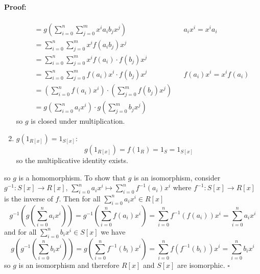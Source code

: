 \documentclass [12pt] {article}
\newenvironment{proof}{\paragraph{Proof:}}{\hfill$\square$}
\begin{document}
\begin{proof}
\begin{enumerate}
\begin{align*}
                &= 
                g \left(\sum^{n}_{i = 0} \sum^{m}_{j = 0} x^i a_i b_j x^j \right)
                && a_i x^i = x^i a_i \\
                &= \sum^{n}_{i = 0} \sum^{m}_{j = 0} x^i f(a_i b_j) x^j \\
                &= \sum^{n}_{i = 0} \sum^{m}_{j = 0} x^i f(a_i) \cdot f(b_j) x^j \\
                &= \sum^{n}_{i = 0} \sum^{m}_{j = 0} f(a_i) x^i \cdot f(b_j) x^j
                && f(a_i) x^i = x^i f(a_i) \\
                &= \left(\sum^{n}_{i = 0} f(a_i) x^i \right) \cdot \left( \sum^{m}_{j = 0} f(b_j) x^j \right) \\
                &= g\left(\sum^{n}_{i = 0} a_i x^i \right) \cdot g \left( \sum^{m}_{j = 0} b_j x^j \right)
            \end{align*}
            so $g$ is closed under multiplication.
        \item $g(1_{R[x]}) = 1_{S[x]}$:
            \[
                g(1_{R[x]}) = f(1_{R}) = 1_{S} = 1_{S[x]}
            \]
            so the multiplicative identity exists.
    \end{enumerate}
    so $g$ is a homomorphism. To show that $g$ is an isomorphism, consider $g^{-1} : S[x] \to R[x]$, 
    $\sum^{n}_{i = 0} a_i x^i \mapsto \sum^{n}_{i = 0} f^{-1}(a_i) x^i$ where 
    $f^{-1} : S[x] \to R[x]$ is the inverse of $f$. Then for all $\sum^{n}_{i = 0} a_i x^i \in R[x]$
    \[
        g^{-1}\left (g\left (\sum^{n}_{i = 0} a_i x^i \right) \right) 
        = g^{-1}\left (\sum^{n}_{i = 0} f\left (a_i \right) x^i \right)
        = \sum^{n}_{i = 0} f^{-1}\left (f\left (a_i \right) \right) x^i
        = \sum^{n}_{i = 0} a_i x^i
    \]
    and for all $\sum^{n}_{i = 0} b_i x^i \in S[x]$ we have
    \[
        g\left( g^{-1}\left( \sum^{n}_{i = 0} b_i x^i \right) \right) 
        = g\left( \sum^{n}_{i = 0} f^{-1}\left( b_i \right) x^i \right)
        = \sum^{n}_{i = 0} f\left( f^{-1}\left( b_i \right) \right) x^i
        = \sum^{n}_{i = 0} b_i x^i
    \]
    so $g$ is an isomorphism and therefore $R[x]$ and $S[x]$ are isomorphic.
\end{proof}

\newpage
\end{document}
